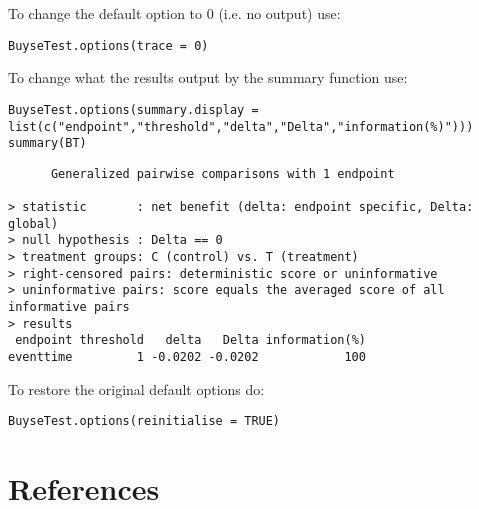 \documentclass[12pt]{article}
\begin{document}
To change the default option to 0 (i.e. no output) use:
\lstset{language=r,label= ,caption= ,captionpos=b,numbers=none}
\begin{lstlisting}
BuyseTest.options(trace = 0)
\end{lstlisting}

To change what the results output by the summary function use:
\lstset{language=r,label= ,caption= ,captionpos=b,numbers=none}
\begin{lstlisting}
BuyseTest.options(summary.display = list(c("endpoint","threshold","delta","Delta","information(%)")))
summary(BT)
\end{lstlisting}

\begin{verbatim}
      Generalized pairwise comparisons with 1 endpoint

> statistic       : net benefit (delta: endpoint specific, Delta: global) 
> null hypothesis : Delta == 0 
> treatment groups: C (control) vs. T (treatment) 
> right-censored pairs: deterministic score or uninformative
> uninformative pairs: score equals the averaged score of all informative pairs
> results
 endpoint threshold   delta   Delta information(%)
eventtime         1 -0.0202 -0.0202            100
\end{verbatim}


To restore the original default options do:
\lstset{language=r,label= ,caption= ,captionpos=b,numbers=none}
\begin{lstlisting}
BuyseTest.options(reinitialise = TRUE)
\end{lstlisting}

\clearpage


\section*{References}
\label{sec:org5c2c928}
\begingroup
\renewcommand{\section}[2]{}




\endgroup
\end{document}
